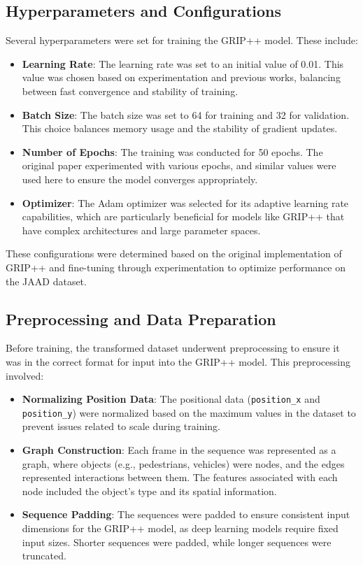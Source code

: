 \subsection{Hyperparameters and Configurations}

\tab Several hyperparameters were set for training the GRIP++ model. These include:

\begin{itemize}
    \item \textbf{Learning Rate}: The learning rate was set to an initial value of 0.01. This value was chosen based on experimentation and previous works, balancing between fast convergence and stability of training.
    \item \textbf{Batch Size}: The batch size was set to 64 for training and 32 for validation. This choice balances memory usage and the stability of gradient updates.
    \item \textbf{Number of Epochs}: The training was conducted for 50 epochs. The original paper experimented with various epochs, and similar values were used here to ensure the model converges appropriately.
    \item \textbf{Optimizer}: The Adam optimizer was selected for its adaptive learning rate capabilities, which are particularly beneficial for models like GRIP++ that have complex architectures and large parameter spaces.
\end{itemize}

These configurations were determined based on the original implementation of GRIP++ and fine-tuning through experimentation to optimize performance on the JAAD dataset.

\subsection{Preprocessing and Data Preparation}


\tab Before training, the transformed dataset underwent preprocessing to ensure it was in the correct format for input into the GRIP++ model. This preprocessing involved:

\begin{itemize}
    \item \textbf{Normalizing Position Data}: The positional data (\verb|position_x| and \verb|position_y|) were normalized based on the maximum values in the dataset to prevent issues related to scale during training.
    \item \textbf{Graph Construction}: Each frame in the sequence was represented as a graph, where objects (e.g., pedestrians, vehicles) were nodes, and the edges represented interactions between them. The features associated with each node included the object's type and its spatial information.
    \item \textbf{Sequence Padding}: The sequences were padded to ensure consistent input dimensions for the GRIP++ model, as deep learning models require fixed input sizes. Shorter sequences were padded, while longer sequences were truncated.
\end{itemize}
    

